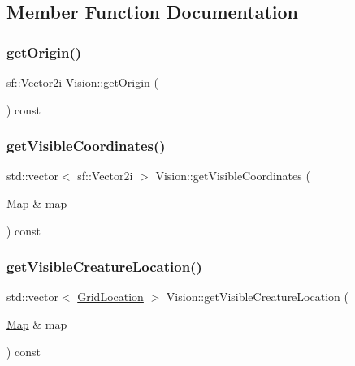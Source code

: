 \subsection{Member Function Documentation}
\mbox{\label{class_vision_a4ff74199025d8054955f6bd335b5699d}} 
\subsubsection{\texorpdfstring{get\+Origin()}{getOrigin()}}
{\footnotesize\ttfamily sf\+::\+Vector2i Vision\+::get\+Origin (\begin{DoxyParamCaption}{ }\end{DoxyParamCaption}) const}

\mbox{\label{class_vision_adda6f028099b3685f4d822ba5c62ac47}} 
\subsubsection{\texorpdfstring{get\+Visible\+Coordinates()}{getVisibleCoordinates()}}
{\footnotesize\ttfamily std\+::vector$<$ sf\+::\+Vector2i $>$ Vision\+::get\+Visible\+Coordinates (\begin{DoxyParamCaption}\item[{\mbox{\hyperlink{class_map}{Map}} \&}]{map }\end{DoxyParamCaption}) const}

\mbox{\label{class_vision_a8047527dbf01dfaafdb41493a5b615de}} 
\subsubsection{\texorpdfstring{get\+Visible\+Creature\+Location()}{getVisibleCreatureLocation()}}
{\footnotesize\ttfamily std\+::vector$<$ \mbox{\hyperlink{struct_grid_location}{Grid\+Location}} $>$ Vision\+::get\+Visible\+Creature\+Location (\begin{DoxyParamCaption}\item[{\mbox{\hyperlink{class_map}{Map}} \&}]{map }\end{DoxyParamCaption}) const}

